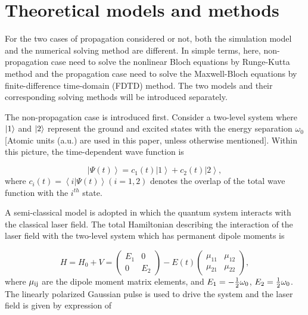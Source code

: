 \documentclass[10pt,letterpaper]{article}
\begin{document}
\section{Theoretical models and methods}
For the two cases of propagation considered or not, both the simulation model and the numerical solving method are different. In simple terms, here, non-propagation case need to solve the nonlinear Bloch equations by Runge-Kutta method and the propagation case need to solve the Maxwell-Bloch equations by finite-difference time-domain (FDTD) method. The two models and their corresponding solving methods will be introduced separately.

The non-propagation case is introduced first. Consider a two-level system where $\left| {\rm{1}} \right\rangle$ and $\left| {\rm{2}} \right\rangle$ represent the ground and excited states with the energy separation $ \omega_0 $ [Atomic units (a.u.) are used in this paper, unless otherwise mentioned]. Within this picture, the time-dependent wave function is

\begin{equation}
\left| {\varPsi \left( t \right)} \right\rangle  = {c_1}(t)\left| 1 \right\rangle  + {c_2}(t)\left| 2 \right\rangle,
\label{eq1}
\end{equation}
where $ c_{i}(t) = \left\langle {i} | \varPsi \left( t \right) \right\rangle(i=1,2) $ denotes the overlap of the total wave function with the $i^{th}$ state.

A semi-classical model is adopted in which the quantum system interacts with the classical laser field. The total Hamiltonian describing the interaction of the laser field with the two-level system which has permanent dipole moments is \cite{YangWeifeng-Two-Level-PLA-2007}

\begin{equation}
H = {H_0} + V = \left( {\begin{array}{*{20}{c}}
	{{E_1}}&0\\
	0&{{E_2}}
	\end{array}} \right) - E(t)\left( {\begin{array}{*{20}{c}}
	{{\mu _{11}}}&{{\mu _{12}}}\\
	{{\mu _{21}}}&{{\mu _{22}}}
	\end{array}} \right),
\label{eq2}
\end{equation}
where $ \mu_{\rm{ij}} $ are the dipole moment matrix elements, and ${E_1} =  - {1 \over 2}{\omega _0}$, ${E_2} =   {1 \over 2}{\omega _0}$. The linearly polarized Gaussian pulse is used to drive the system and the laser field is given by expression of
\end{document}

